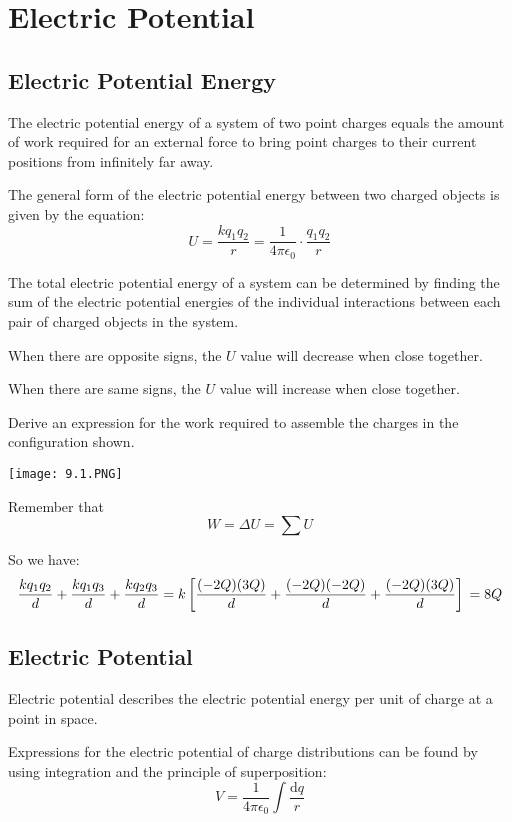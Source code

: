 \documentclass[../em.tex]{subfiles}
\begin{document}
\chapter{Electric Potential}
\section{Electric Potential Energy}
The electric potential energy of a system of two point charges equals the amount of 
work required for an external force to bring point charges to their 
current positions from infinitely far away.

The general form of the electric potential energy between
two charged objects is given by the equation:
\[U=\frac{kq_1q_2}{r}=\frac{1}{4\pi\epsilon_0}\cdot\frac{q_1q_2}{r}\]

The total electric potential energy of a system can be determined by 
finding the sum of the electric potential energies of the individual
interactions between each pair of charged objects in the system.

When there are opposite signs, the $U$ value will decrease when close together.

When there are same signs, the $U$ value will increase when close together.

\begin{example}
    Derive an expression for the work required to assemble the charges
    in the configuration shown.
    \begin{center}
        \texttt{[image: 9.1.PNG]}
    \end{center}

    Remember that
    \[W = \Delta U = \sum U\]
    
    So we have:
    \[\frac{kq_1q_2}{d}+\frac{kq_1q_3}{d}+\frac{kq_2q_3}{d}=\\
    k\left[\frac{(-2Q)(3Q)}{d}+\frac{(-2Q)(-2Q)}{d}+\frac{(-2Q)(3Q)}{d}\right]\\
    =8Q\]
\end{example}
\section{Electric Potential}
Electric potential describes the electric potential energy per unit of charge at a point in space.

Expressions for the electric potential of charge distributions can be found by
using integration and the principle of superposition:
\[V=\frac{1}{4\pi\epsilon_0}\int \frac{\mathrm{d}q}{r}\]
\end{document}
